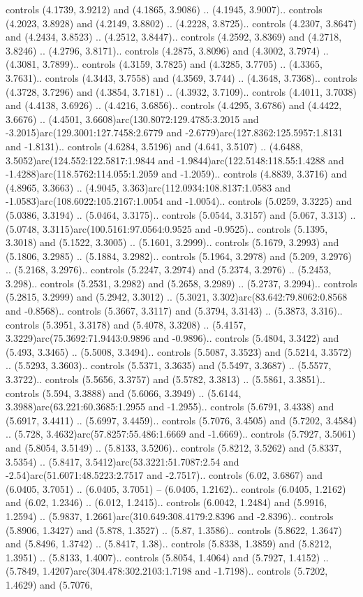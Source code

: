 controls (4.1739, 3.9212) and (4.1865, 3.9086) .. (4.1945, 3.9007).. controls (4.2023, 3.8928) and (4.2149, 3.8802) .. (4.2228, 3.8725).. controls (4.2307, 3.8647) and (4.2434, 3.8523) .. (4.2512, 3.8447).. controls (4.2592, 3.8369) and (4.2718, 3.8246) .. (4.2796, 3.8171).. controls (4.2875, 3.8096) and (4.3002, 3.7974) .. (4.3081, 3.7899).. controls (4.3159, 3.7825) and (4.3285, 3.7705) .. (4.3365, 3.7631).. controls (4.3443, 3.7558) and (4.3569, 3.744) .. (4.3648, 3.7368).. controls (4.3728, 3.7296) and (4.3854, 3.7181) .. (4.3932, 3.7109).. controls (4.4011, 3.7038) and (4.4138, 3.6926) .. (4.4216, 3.6856).. controls (4.4295, 3.6786) and (4.4422, 3.6676) .. (4.4501, 3.6608)arc(130.8072:129.4785:3.2015 and -3.2015)arc(129.3001:127.7458:2.6779 and -2.6779)arc(127.8362:125.5957:1.8131 and -1.8131).. controls (4.6284, 3.5196) and (4.641, 3.5107) .. (4.6488, 3.5052)arc(124.552:122.5817:1.9844 and -1.9844)arc(122.5148:118.55:1.4288 and -1.4288)arc(118.5762:114.055:1.2059 and -1.2059).. controls (4.8839, 3.3716) and (4.8965, 3.3663) .. (4.9045, 3.363)arc(112.0934:108.8137:1.0583 and -1.0583)arc(108.6022:105.2167:1.0054 and -1.0054).. controls (5.0259, 3.3225) and (5.0386, 3.3194) .. (5.0464, 3.3175).. controls (5.0544, 3.3157) and (5.067, 3.313) .. (5.0748, 3.3115)arc(100.5161:97.0564:0.9525 and -0.9525).. controls (5.1395, 3.3018) and (5.1522, 3.3005) .. (5.1601, 3.2999).. controls (5.1679, 3.2993) and (5.1806, 3.2985) .. (5.1884, 3.2982).. controls (5.1964, 3.2978) and (5.209, 3.2976) .. (5.2168, 3.2976).. controls (5.2247, 3.2974) and (5.2374, 3.2976) .. (5.2453, 3.298).. controls (5.2531, 3.2982) and (5.2658, 3.2989) .. (5.2737, 3.2994).. controls (5.2815, 3.2999) and (5.2942, 3.3012) .. (5.3021, 3.302)arc(83.642:79.8062:0.8568 and -0.8568).. controls (5.3667, 3.3117) and (5.3794, 3.3143) .. (5.3873, 3.316).. controls (5.3951, 3.3178) and (5.4078, 3.3208) .. (5.4157, 3.3229)arc(75.3692:71.9443:0.9896 and -0.9896).. controls (5.4804, 3.3422) and (5.493, 3.3465) .. (5.5008, 3.3494).. controls (5.5087, 3.3523) and (5.5214, 3.3572) .. (5.5293, 3.3603).. controls (5.5371, 3.3635) and (5.5497, 3.3687) .. (5.5577, 3.3722).. controls (5.5656, 3.3757) and (5.5782, 3.3813) .. (5.5861, 3.3851).. controls (5.594, 3.3888) and (5.6066, 3.3949) .. (5.6144, 3.3988)arc(63.221:60.3685:1.2955 and -1.2955).. controls (5.6791, 3.4338) and (5.6917, 3.4411) .. (5.6997, 3.4459).. controls (5.7076, 3.4505) and (5.7202, 3.4584) .. (5.728, 3.4632)arc(57.8257:55.486:1.6669 and -1.6669).. controls (5.7927, 3.5061) and (5.8054, 3.5149) .. (5.8133, 3.5206).. controls (5.8212, 3.5262) and (5.8337, 3.5354) .. (5.8417, 3.5412)arc(53.3221:51.7087:2.54 and -2.54)arc(51.6071:48.5223:2.7517 and -2.7517).. controls (6.02, 3.6867) and (6.0405, 3.7051) .. (6.0405, 3.7051) -- (6.0405, 1.2162).. controls (6.0405, 1.2162) and (6.02, 1.2346) .. (6.012, 1.2415).. controls (6.0042, 1.2484) and (5.9916, 1.2594) .. (5.9837, 1.2661)arc(310.649:308.4179:2.8396 and -2.8396).. controls (5.8906, 1.3427) and (5.878, 1.3527) .. (5.87, 1.3586).. controls (5.8622, 1.3647) and (5.8496, 1.3742) .. (5.8417, 1.38).. controls (5.8338, 1.3859) and (5.8212, 1.3951) .. (5.8133, 1.4007).. controls (5.8054, 1.4064) and (5.7927, 1.4152) .. (5.7849, 1.4207)arc(304.478:302.2103:1.7198 and -1.7198).. controls (5.7202, 1.4629) and (5.7076, 